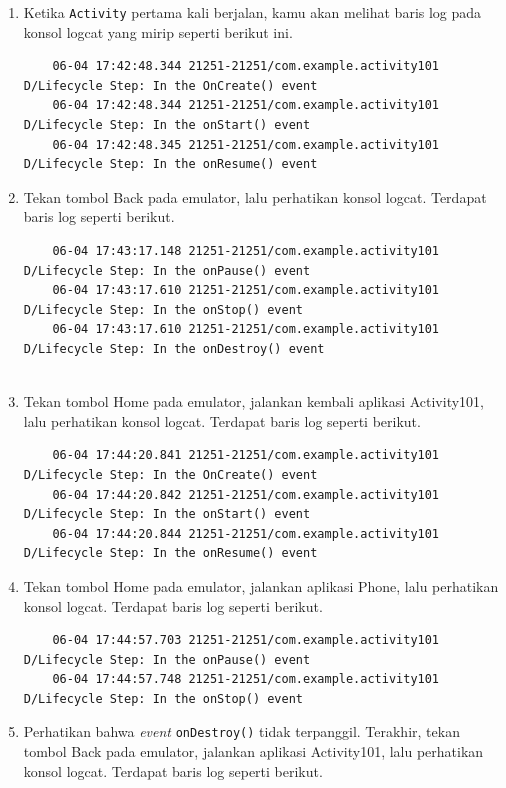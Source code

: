 \documentclass{scrartcl}
\begin{document}
\begin{enumerate}
	\item Ketika \texttt{Activity} pertama kali berjalan, kamu akan melihat baris log pada konsol logcat yang mirip seperti berikut ini.

	\begin{verbatim}
	06-04 17:42:48.344 21251-21251/com.example.activity101 D/Lifecycle Step: In the OnCreate() event
	06-04 17:42:48.344 21251-21251/com.example.activity101 D/Lifecycle Step: In the onStart() event
	06-04 17:42:48.345 21251-21251/com.example.activity101 D/Lifecycle Step: In the onResume() event
	\end{verbatim}

	\item Tekan tombol Back pada emulator, lalu perhatikan konsol logcat. Terdapat baris log seperti berikut.
	
	\begin{verbatim}
	06-04 17:43:17.148 21251-21251/com.example.activity101 D/Lifecycle Step: In the onPause() event
	06-04 17:43:17.610 21251-21251/com.example.activity101 D/Lifecycle Step: In the onStop() event
	06-04 17:43:17.610 21251-21251/com.example.activity101 D/Lifecycle Step: In the onDestroy() event
	
	\end{verbatim}
	
	\item	Tekan tombol Home pada emulator, jalankan kembali aplikasi Activity101, lalu perhatikan konsol logcat. Terdapat baris log seperti berikut.
	
	\begin{verbatim}
	06-04 17:44:20.841 21251-21251/com.example.activity101 D/Lifecycle Step: In the OnCreate() event
	06-04 17:44:20.842 21251-21251/com.example.activity101 D/Lifecycle Step: In the onStart() event
	06-04 17:44:20.844 21251-21251/com.example.activity101 D/Lifecycle Step: In the onResume() event
	\end{verbatim}
	
	\item Tekan tombol Home pada emulator, jalankan aplikasi Phone, lalu perhatikan konsol logcat. Terdapat baris log seperti berikut.
	
	\begin{verbatim}
	06-04 17:44:57.703 21251-21251/com.example.activity101 D/Lifecycle Step: In the onPause() event
	06-04 17:44:57.748 21251-21251/com.example.activity101 D/Lifecycle Step: In the onStop() event
	\end{verbatim}
	
	\item Perhatikan bahwa \textit{event} \texttt{onDestroy()} tidak terpanggil. Terakhir, tekan tombol Back pada emulator, jalankan aplikasi Activity101, lalu perhatikan konsol logcat. Terdapat baris log seperti berikut.
	

\end{enumerate}
\end{document}
